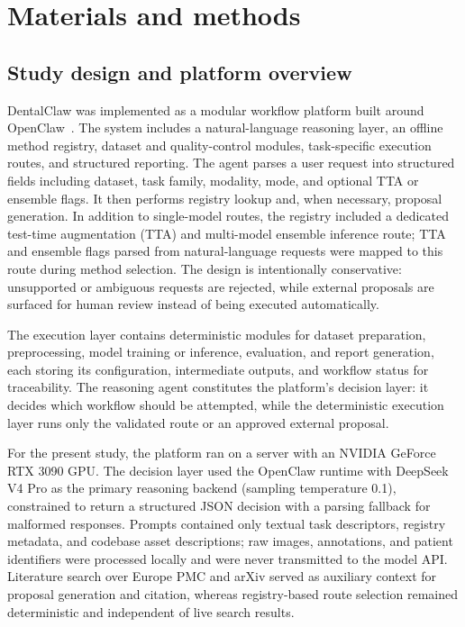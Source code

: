 \documentclass[final,5p,times,twocolumn]{elsarticle}
\begin{document}
\section{Materials and methods}

\subsection{Study design and platform overview}
DentalClaw was implemented as a modular workflow platform built around OpenClaw~\cite{openclaw}. The system includes a natural-language reasoning layer, an offline method registry, dataset and quality-control modules, task-specific execution routes, and structured reporting. The agent parses a user request into structured fields including dataset, task family, modality, mode, and optional TTA or ensemble flags. It then performs registry lookup and, when necessary, proposal generation. In addition to single-model routes, the registry included a dedicated test-time augmentation (TTA) and multi-model ensemble inference route; TTA and ensemble flags parsed from natural-language requests were mapped to this route during method selection. The design is intentionally conservative: unsupported or ambiguous requests are rejected, while external proposals are surfaced for human review instead of being executed automatically.

The execution layer contains deterministic modules for dataset preparation, preprocessing, model training or inference, evaluation, and report generation, each storing its configuration, intermediate outputs, and workflow status for traceability. The reasoning agent constitutes the platform's decision layer: it decides which workflow should be attempted, while the deterministic execution layer runs only the validated route or an approved external proposal.

For the present study, the platform ran on a server with an NVIDIA GeForce RTX 3090 GPU. The decision layer used the OpenClaw runtime with DeepSeek V4 Pro as the primary reasoning backend (sampling temperature 0.1), constrained to return a structured JSON decision with a parsing fallback for malformed responses. Prompts contained only textual task descriptors, registry metadata, and codebase asset descriptions; raw images, annotations, and patient identifiers were processed locally and were never transmitted to the model API. Literature search over Europe PMC and arXiv served as auxiliary context for proposal generation and citation, whereas registry-based route selection remained deterministic and independent of live search results.
\end{document}
